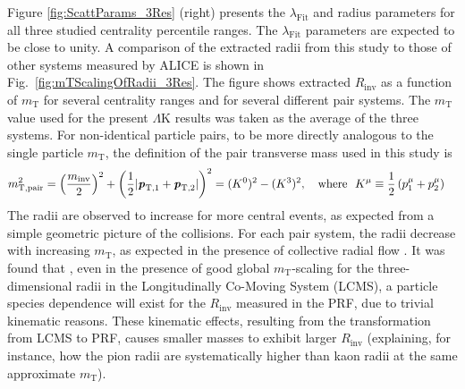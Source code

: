 \documentclass[ALICE,manyauthors]{cernphprep}
\newcommand{\mt}{$m_{\mathrm{T}}$\xspace}
\newcommand{\LamK}{$\Lambda$K\xspace}
\begin{document}
Figure \ref{fig:ScattParams_3Res} (right) presents the $\lambda_{\mathrm{Fit}}$ and radius parameters for all three studied centrality percentile ranges.
The $\lambda_{\mathrm{Fit}}$ parameters are expected to be close to unity. 
A comparison of the extracted radii from this study to those of other systems measured by ALICE \cite{Adam:2015vja} is shown in Fig.\ \ref{fig:mTScalingOfRadii_3Res}. 
The figure shows extracted $R_{\mathrm{inv}}$ as a function of \mt for several centrality ranges and for several different pair systems.
The \mt value used for the present \LamK results was taken as the average of the three systems.
For non-identical particle pairs, to be more directly analogous to the single particle \mt, the definition of the pair transverse mass used in this study is
\begin{equation}
\begin{aligned}
 m_{\mathrm{T, pair}}^{2} &= \left( \frac{m_{\mathrm{inv}}}{2} \right)^{2} + \left( \frac{1}{2} |\textbf{\textit{p}}_{\mathrm{T,1}} + \textbf{\textit{p}}_{\mathrm{T,2}}| \right)^{2} = (K^{0})^{2} - (K^{3})^{2}, \quad \mathrm{where} ~~K^{\mu} \equiv \frac{1}{2} \left( p_{1}^{\mu} + p_{2}^{\mu} \right)
\end{aligned}
\label{eqn:PairmTv1}
\end{equation}
The radii are observed to increase for more central events, as expected from a simple geometric picture of the collisions.
For each pair system, the radii decrease with increasing \mt, as expected in the presence of collective radial flow \cite{Akkelin:1995gh}.
It was found that \cite{Kisiel:2014upa}, even in the presence of good global \mt-scaling for the three-dimensional radii in the Longitudinally Co-Moving System (LCMS), a particle species dependence will exist for the $R_{\mathrm{inv}}$ measured in the PRF, due to trivial kinematic reasons.
These kinematic effects, resulting from the transformation from LCMS to PRF, causes smaller masses to exhibit larger $R_{\mathrm{inv}}$ \cite{Adam:2015vja} (explaining, for instance, how the pion radii are systematically higher than kaon radii at the same approximate \mt).
\end{document}
